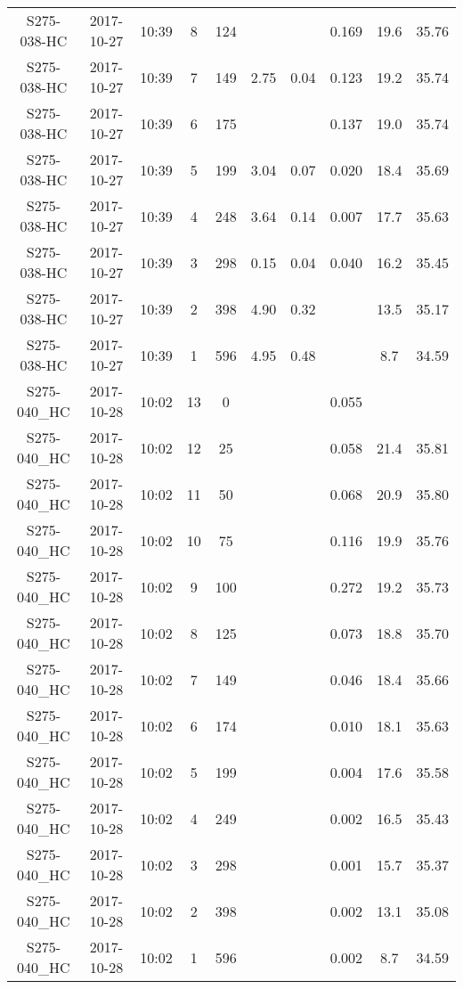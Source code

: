\begin{longtable}{cccccccccc}
  S275-038-HC & 2017-10-27 & 10:39 & 8 & 124 &  &  & 0.169 & 19.6 & 35.76 \\ 
  S275-038-HC & 2017-10-27 & 10:39 & 7 & 149 & 2.75 & 0.04 & 0.123 & 19.2 & 35.74 \\ 
  S275-038-HC & 2017-10-27 & 10:39 & 6 & 175 &  &  & 0.137 & 19.0 & 35.74 \\ 
  S275-038-HC & 2017-10-27 & 10:39 & 5 & 199 & 3.04 & 0.07 & 0.020 & 18.4 & 35.69 \\ 
  S275-038-HC & 2017-10-27 & 10:39 & 4 & 248 & 3.64 & 0.14 & 0.007 & 17.7 & 35.63 \\ 
  S275-038-HC & 2017-10-27 & 10:39 & 3 & 298 & 0.15 & 0.04 & 0.040 & 16.2 & 35.45 \\ 
  S275-038-HC & 2017-10-27 & 10:39 & 2 & 398 & 4.90 & 0.32 &  & 13.5 & 35.17 \\ 
  S275-038-HC & 2017-10-27 & 10:39 & 1 & 596 & 4.95 & 0.48 &  & 8.7 & 34.59 \\ 
  S275-040\_HC & 2017-10-28 & 10:02 & 13 & 0 &  &  & 0.055 &  &  \\ 
  S275-040\_HC & 2017-10-28 & 10:02 & 12 & 25 &  &  & 0.058 & 21.4 & 35.81 \\ 
  S275-040\_HC & 2017-10-28 & 10:02 & 11 & 50 &  &  & 0.068 & 20.9 & 35.80 \\ 
  S275-040\_HC & 2017-10-28 & 10:02 & 10 & 75 &  &  & 0.116 & 19.9 & 35.76 \\ 
  S275-040\_HC & 2017-10-28 & 10:02 & 9 & 100 &  &  & 0.272 & 19.2 & 35.73 \\ 
  S275-040\_HC & 2017-10-28 & 10:02 & 8 & 125 &  &  & 0.073 & 18.8 & 35.70 \\ 
  S275-040\_HC & 2017-10-28 & 10:02 & 7 & 149 &  &  & 0.046 & 18.4 & 35.66 \\ 
  S275-040\_HC & 2017-10-28 & 10:02 & 6 & 174 &  &  & 0.010 & 18.1 & 35.63 \\ 
  S275-040\_HC & 2017-10-28 & 10:02 & 5 & 199 &  &  & 0.004 & 17.6 & 35.58 \\ 
  S275-040\_HC & 2017-10-28 & 10:02 & 4 & 249 &  &  & 0.002 & 16.5 & 35.43 \\ 
  S275-040\_HC & 2017-10-28 & 10:02 & 3 & 298 &  &  & 0.001 & 15.7 & 35.37 \\ 
  S275-040\_HC & 2017-10-28 & 10:02 & 2 & 398 &  &  & 0.002 & 13.1 & 35.08 \\ 
  S275-040\_HC & 2017-10-28 & 10:02 & 1 & 596 &  &  & 0.002 & 8.7 & 34.59 \\ 
  \hline
\end{longtable}

